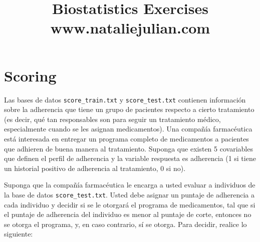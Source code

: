 \documentclass[11pt,onside]{article}
\title{\blue Biostatistics Exercises \\
\blueb www.nataliejulian.com}
\author{}
\date{} %
\begin{document}


\maketitle

\section*{Scoring}

Las bases de datos \texttt{score\_train.txt} y \texttt{score\_test.txt} contienen información sobre la adherencia que tiene un grupo de pacientes respecto a cierto tratamiento (es decir, qué tan responsables son para seguir un tratamiento médico, especialmente cuando se les asignan medicamentos). Una compañía farmacéutica está interesada en entregar un programa completo de medicamentos a pacientes que adhieren de buena manera al tratamiento. Suponga que existen 5 covariables que definen el perfil de adherencia y la variable respuesta es adherencia (1 si tiene un historial positivo de adherencia al tratamiento, 0 si no).

Suponga que la compañía farmacéutica le encarga a usted evaluar a individuos de la base de datos \texttt{score\_test.txt}. Usted debe asignar un puntaje de adherencia a cada individuo y decidir si se le otorgará el programa de medicamentos, tal que si el puntaje de adherencia del individuo es menor al puntaje de corte, entonces no se otorga el programa, y, en caso contrario, sí se otorga. Para decidir, realice lo siguiente:
\end{document}
